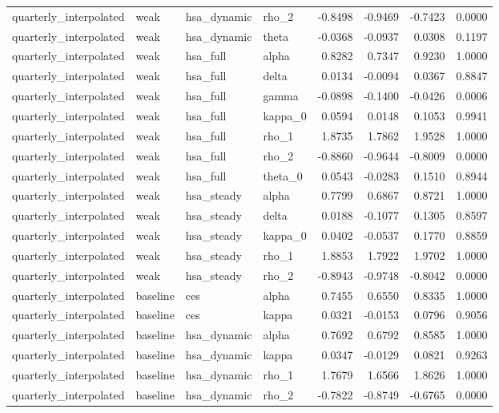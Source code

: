 \begin{tabular}{llllrrrr}
quarterly\_interpolated & weak & hsa\_dynamic & rho\_2 & -0.8498 & -0.9469 & -0.7423 & 0.0000 \\
quarterly\_interpolated & weak & hsa\_dynamic & theta & -0.0368 & -0.0937 & 0.0308 & 0.1197 \\
quarterly\_interpolated & weak & hsa\_full & alpha & 0.8282 & 0.7347 & 0.9230 & 1.0000 \\
quarterly\_interpolated & weak & hsa\_full & delta & 0.0134 & -0.0094 & 0.0367 & 0.8847 \\
quarterly\_interpolated & weak & hsa\_full & gamma & -0.0898 & -0.1400 & -0.0426 & 0.0006 \\
quarterly\_interpolated & weak & hsa\_full & kappa\_0 & 0.0594 & 0.0148 & 0.1053 & 0.9941 \\
quarterly\_interpolated & weak & hsa\_full & rho\_1 & 1.8735 & 1.7862 & 1.9528 & 1.0000 \\
quarterly\_interpolated & weak & hsa\_full & rho\_2 & -0.8860 & -0.9644 & -0.8009 & 0.0000 \\
quarterly\_interpolated & weak & hsa\_full & theta\_0 & 0.0543 & -0.0283 & 0.1510 & 0.8944 \\
quarterly\_interpolated & weak & hsa\_steady & alpha & 0.7799 & 0.6867 & 0.8721 & 1.0000 \\
quarterly\_interpolated & weak & hsa\_steady & delta & 0.0188 & -0.1077 & 0.1305 & 0.8597 \\
quarterly\_interpolated & weak & hsa\_steady & kappa\_0 & 0.0402 & -0.0537 & 0.1770 & 0.8859 \\
quarterly\_interpolated & weak & hsa\_steady & rho\_1 & 1.8853 & 1.7922 & 1.9702 & 1.0000 \\
quarterly\_interpolated & weak & hsa\_steady & rho\_2 & -0.8943 & -0.9748 & -0.8042 & 0.0000 \\
quarterly\_interpolated & baseline & ces & alpha & 0.7455 & 0.6550 & 0.8335 & 1.0000 \\
quarterly\_interpolated & baseline & ces & kappa & 0.0321 & -0.0153 & 0.0796 & 0.9056 \\
quarterly\_interpolated & baseline & hsa\_dynamic & alpha & 0.7692 & 0.6792 & 0.8585 & 1.0000 \\
quarterly\_interpolated & baseline & hsa\_dynamic & kappa & 0.0347 & -0.0129 & 0.0821 & 0.9263 \\
quarterly\_interpolated & baseline & hsa\_dynamic & rho\_1 & 1.7679 & 1.6566 & 1.8626 & 1.0000 \\
quarterly\_interpolated & baseline & hsa\_dynamic & rho\_2 & -0.7822 & -0.8749 & -0.6765 & 0.0000 \\

\end{tabular}
